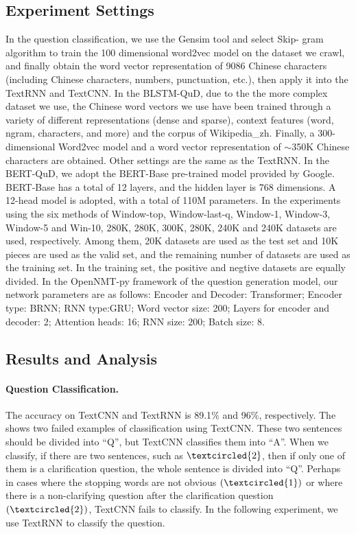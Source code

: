 \subsection{Experiment Settings}
In the question classification, we use the Gensim tool and select Skip- gram algorithm to train the 100 dimensional word2vec model on the dataset we crawl, and finally obtain the word vector representation of 9086 Chinese characters (including Chinese characters, numbers, punctuation, etc.), then apply it into the TextRNN and TextCNN. In the BLSTM-QuD, due to the the more complex 
dataset we use, the Chinese word vectors we use have been trained through 
a variety of different representations (dense and sparse), 
context features (word, ngram, characters, and more) and the 
corpus of Wikipedia\_zh. Finally, a 300-dimensional Word2vec model and 
a word vector representation of $\sim$350K Chinese characters are obtained. 
Other settings are the same as the TextRNN. In the BERT-QuD, 
we adopt the BERT-Base pre-trained model provided by Google. 
BERT-Base has a total of 12 layers, and the hidden layer is 768 dimensions. 
A 12-head model is adopted, with a total of 110M parameters. 
In the experiments using the six methods of Window-top, Window-last-q, Window-1, Window-3, Window-5 and Win-10, 280K, 280K, 300K, 280K, 240K and 240K datasets are used, respectively. Among them, 20K datasets are used as the test set and 10K pieces are used as the valid set, and the remaining number of datasets are used as the training set. In the training set, the positive and negtive datasets are equally divided. In the OpenNMT-py framework of the question generation model, our network parameters are as follows: Encoder and Decoder: Transformer; Encoder type: BRNN; RNN type:GRU; Word vector size: 200; Layers for encoder and decoder: 2; Attention heads: 16; RNN size: 200; Batch size: 8. 

\subsection{Results and Analysis}
\paragraph{Question Classification.} 
The accuracy on TextCNN and TextRNN is 89.1$\%$ and 96$\%$, respectively. The  shows two failed examples of classification using TextCNN. These two sentences should be divided into ``Q'', but TextCNN classifies them into ``A''. When we classify, if there are two sentences, such as $\textcircled{2}$, then if only one of them is a clarification question, the whole sentence is divided into ``Q''. Perhaps in cases where the stopping words are not obvious $\left( \textcircled{1} \right)$ or where there is a non-clarifying question after the clarification question$\left( \textcircled{2} \right)$, TextCNN fails to classify. In the following experiment, we use TextRNN to classify the question.

